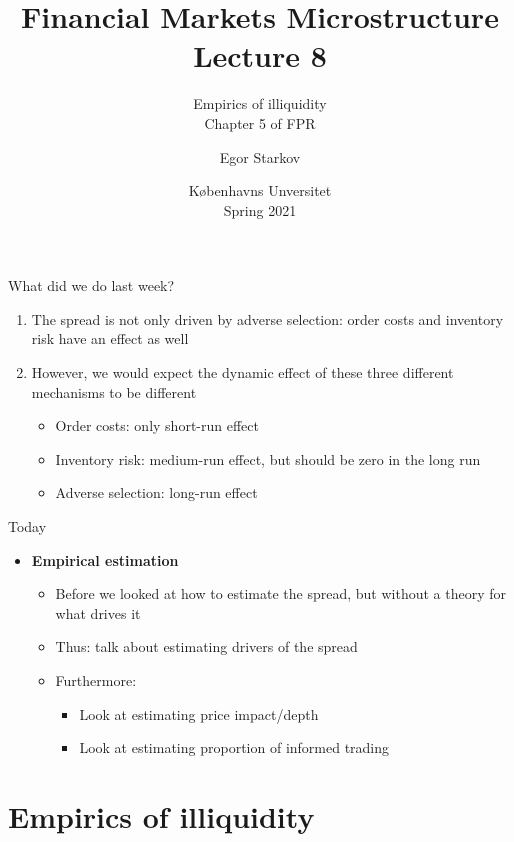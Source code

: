 \documentclass[english,10pt
,aspectratio=169
]{beamer}
\title{Financial Markets Microstructure \\ Lecture 8}
\subtitle{Empirics of illiquidity\\
	Chapter 5 of FPR}
\author{Egor Starkov}
\date{K{\o}benhavns Unversitet \\
	Spring 2021}
\begin{document}
	

\frame[plain]{\titlepage}


\begin{frame}{What did we do last week?}
	\begin{enumerate}
		\item The spread is not only driven by adverse selection: order costs and inventory risk have an effect as well
		\item However, we would expect the dynamic effect of these three different mechanisms to be different
		\begin{itemize}
			\item Order costs: only short-run effect 
			\item Inventory risk: medium-run effect, but should be zero in the long run
			\item Adverse selection: long-run effect 
		\end{itemize}
	\end{enumerate}
\end{frame}


\begin{frame}{Today}
	\begin{itemize}
		\item \textbf{Empirical estimation}
		\begin{itemize}
			\item Before we looked at how to estimate the spread, but without a theory for what drives it
			\item Thus: talk about estimating drivers of the spread
			\item Furthermore:
			\begin{itemize}
				\item Look at estimating price impact/depth
				\item Look at estimating proportion of informed trading
			\end{itemize}
		\end{itemize}
	\end{itemize}
\end{frame}



\section{Empirics of illiquidity}
\end{document}
